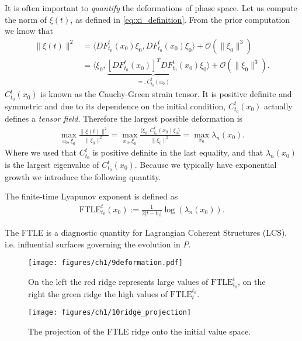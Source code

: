 \begin{ex}
	It is often important to {\em quantify} the deformations of phase space. Let us compute the norm of $\xi(t)$, as defined in \eqref{eq:xi_definition}. From the prior computation we know that 
	\begin{subequations}	\begin{align}
		 \| {\xi}(t) \|^2 &= \langle DF_{t_0}^{t}( {x}_0)  {\xi}_0, DF_{t_0}^{t}( {x}_0) {\xi}_0 \rangle + \mathcal{O}( \| {\xi}_0 \|^3) \\
			   &= \langle  {\xi}_0, \underbrace{\left[ DF_{t_0}^{t}( {x}_0) \right]^T DF_{t_0}^{t}( {x}_0)}_{=: C_{t_0}^{t}( {x}_0)}  {\xi}_0 \rangle + \mathcal{O}( \| {\xi}_0 \|^3).
	\end{align}\end{subequations}
	$C_{t_0}^{t}( {x}_0)$ is known as the Cauchy-Green strain tensor. It is positive definite and symmetric and due to its dependence on the initial condition, $C_{t_0}^{t}(x_0)$ actually defines a \emph{tensor field}.
	Therefore the largest possible deformation is
	\begin{align}
		\max_{ {x}_0, {\xi}_0} \frac{ \| {\xi}(t) \|^2}{ \| {\xi}_0 \|^2} = \max_{ {x}_0,  {\xi}_0}\frac{\langle  {\xi}_0, C_{t_0}^{t}( {x}_0)  {\xi}_0 \rangle}{ \| {\xi}_0 \|^2} = \max_{ {x}_0} \lambda_{n}( {x}_0).
	\end{align}
	Where we used that $C_{t_0}^{t}$ is positive definite in the last equality, and that $\lambda_n( {x}_0)$ is the largest eigenvalue of $C_{t_0}^{t}( {x}_0)$. Because we typically have exponential growth we introduce the following quantity.	
\end{ex}
\begin{definition}
	The finite-time Lyapunov exponent is defined as
	\begin{align}\label{eq:ftle_def}
		\boxed{ \textrm{FTLE} _{t_0}^{t}( {x}_0) := \frac{1}{2|t-t_0|} \log(\lambda_n( {x}_0)).}
	\end{align}
\end{definition}
The FTLE is a diagnostic quantity for Lagrangian Coherent Structures (LCS), i.e. influential surfaces governing the evolution in $P$.
\begin{figure}[h!]
	\centering
	\texttt{[image: figures/ch1/9deformation.pdf]}
	\caption{On the left the red ridge represents large values of $ \textrm{FTLE} _{t_0}^{t}$, on the right the green ridge the high values of $ \textrm{FTLE} _{t}^{t_0}$.}
	\label{fig:FTLE_ridges}
\end{figure}
\begin{figure}[h!]
	\centering
	\texttt{[image: figures/ch1/10ridge\_projection]}
	\caption{The projection of the FTLE ridge onto the initial value space.}
	\label{fig:FTLE_surface}
\end{figure}

